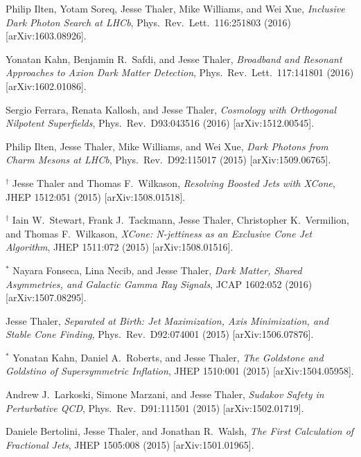 \begin{list}{[]\addtocounter{jessecount}{-1}}{\leftmargin=3em \itemsep=4pt}
\item
 Philip Ilten, Yotam Soreq, Jesse Thaler, Mike Williams, and Wei Xue,
\emph{Inclusive Dark Photon Search at LHCb},
Phys.\ Rev.\ Lett.\ 116:251803 (2016)
[arXiv:1603.08926].

\item
 Yonatan Kahn, Benjamin R.\ Safdi, and Jesse Thaler,
\emph{Broadband and Resonant Approaches to Axion Dark Matter Detection},
Phys.\ Rev.\ Lett.\ 117:141801 (2016)
[arXiv:1602.01086].

\item
 Sergio Ferrara, Renata Kallosh, and Jesse Thaler,
\emph{Cosmology with Orthogonal Nilpotent Superfields},
Phys.\ Rev.\ D93:043516 (2016)
[arXiv:1512.00545].

\item
 Philip Ilten, Jesse Thaler, Mike Williams, and Wei Xue,
\emph{Dark Photons from Charm Mesons at LHCb},
Phys.\ Rev.\ D92:115017 (2015)
[arXiv:1509.06765].

\item
${}^\dagger$ Jesse Thaler and Thomas F.\ Wilkason,
\emph{Resolving Boosted Jets with XCone},
JHEP 1512:051 (2015)
[arXiv:1508.01518].

\item
${}^\dagger$ Iain W.\ Stewart, Frank J.\ Tackmann, Jesse Thaler, Christopher K.\ Vermilion, and Thomas F.\ Wilkason,
\emph{XCone: N-jettiness as an Exclusive Cone Jet Algorithm},
JHEP 1511:072 (2015)
[arXiv:1508.01516].

\item
${}^\ast$ Nayara Fonseca, Lina Necib, and Jesse Thaler,
\emph{Dark Matter, Shared Asymmetries, and Galactic Gamma Ray Signals},
JCAP 1602:052 (2016)
[arXiv:1507.08295].

\item
 Jesse Thaler,
\emph{Separated at Birth: Jet Maximization, Axis Minimization, and Stable Cone Finding},
Phys.\ Rev.\ D92:074001 (2015)
[arXiv:1506.07876].

\item
${}^\ast$ Yonatan Kahn, Daniel A.\ Roberts, and Jesse Thaler,
\emph{The Goldstone and Goldstino of Supersymmetric Inflation},
JHEP 1510:001 (2015)
[arXiv:1504.05958].

\item
 Andrew J.\ Larkoski, Simone Marzani, and Jesse Thaler,
\emph{Sudakov Safety in Perturbative QCD},
Phys.\ Rev.\ D91:111501 (2015)
[arXiv:1502.01719].

\item
 Daniele Bertolini, Jesse Thaler, and Jonathan R.\ Walsh,
\emph{The First Calculation of Fractional Jets},
JHEP 1505:008 (2015)
[arXiv:1501.01965].


\end{list}
